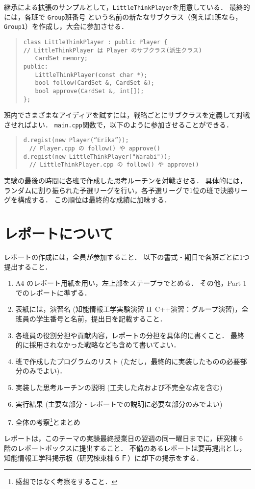 継承による拡張のサンプルとして，\verb+LittleThinkPlayer+を用意している．
最終的には，各班で \verb+Group+班番号 という名前の新たなサブクラス（例えば1班なら，\verb+Group1+）を作成し，大会に参加させる．
\begin{quote}
\begin{verbatim}
class LittleThinkPlayer : public Player {
// LittleThinkPlayer は Player のサブクラス(派生クラス)
　　CardSet memory;
public:
　　LittleThinkPlayer(const char *);
　　bool follow(CardSet &, CardSet &);
　　bool approve(CardSet &, int[]);
};
\end{verbatim}
\end{quote}
班内でさまざまなアイディアを試すには，戦略ごとにサブクラスを定義して対戦させればよい．
\verb+main.cpp+関数で，以下のように参加させることができる．
\begin{quote}
\begin{verbatim}
d.regist(new Player(“Erika”)); 　
　// Player.cpp の follow() や approve() 
d.regist(new LittleThinkPlayer("Warabi")); 
　// LittleThinkPlayer.cpp の follow() や approve() 
\end{verbatim}
\end{quote}

実験の最後の時間に各班で作成した思考ルーチンを対戦させる．
具体的には，ランダムに割り振られた予選リーグを行い，各予選リーグで1位の班で決勝リーグを構成する．
この順位は最終的な成績に加味する．

\section{レポートについて}
レポートの作成には，全員が参加すること．
以下の書式・期日で各班ごとに1つ提出すること．
\begin{enumerate}
 \item A4 のレポート用紙を用い，左上部をステープラでとめる．
その他，Part 1 でのレポートに準ずる．
 \item 表紙には，演習名 (知能情報工学実験演習 II\ C++演習：グループ演習)，全班員の学生番号と名前，提出日を記載すること．
 \item 各班員の役割分担や貢献内容，レポートの分担を具体的に書くこと．
最終的に採用されなかった戦略なども含めて書いてよい．
 \item 班で作成したプログラムのリスト (ただし，最終的に実装したものの必要部分のみでよい)．
 \item 実装した思考ルーチンの説明 (工夫した点および不完全な点を含む)
 \item 実行結果 (主要な部分・レポートでの説明に必要な部分のみでよい)
 \item 全体の考察\footnote{感想ではなく考察をすること．}とまとめ
 \end{enumerate}
レポートは，このテーマの実験最終授業日の翌週の同一曜日までに，研究棟 6 階のレポートボックスに提出すること．
不備のあるレポートは要再提出とし，知能情報工学科掲示板（研究棟東棟６Ｆ）に却下の掲示をする．


